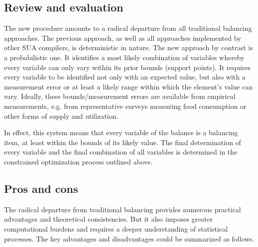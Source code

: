 \documentclass[nojss]{jss}
\begin{document}
\subsection{Review and evaluation}
The new procedure amounts to a radical departure from all traditional balancing approaches. The previous approach, as well as all approaches implemented by other SUA compilers, is deterministic in nature. The new approach by contrast is a probabilistic one. It identifies a most likely combination of variables whereby every variable can only vary within its prior bounds (support points). It requires every variable to be  identified not only with an expected value, but also with a measurement error or at least a likely range within which the element's value can vary. Ideally, these bounds/measurement errors are available from empirical measurements, e.g. from representative surveys measuring food consumption  or other forms of supply and utilization.

In effect, this system means that every variable of the balance is a balancing item, at least within the bounds of its likely value. The final determination of every variable and the final combination of all variables is determined in the constrained optimization process outlined above.

\subsection{Pros and cons}
The radical departure from traditional balancing provides numerous practical advantages and theoretical consistencies. But it also imposes greater computational burdens and requires a deeper understanding of statistical processes. The key advantages and disadvantages could be summarized as follows.
\end{document}
